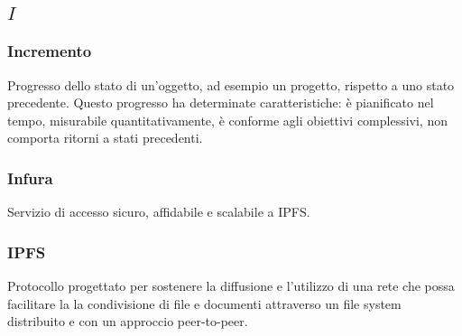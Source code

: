 \subsection*{\quad$I\quad$}
\subsubsection*{Incremento}
Progresso dello stato di un'oggetto, ad esempio un progetto, rispetto a uno stato precedente. Questo progresso ha determinate caratteristiche: è pianificato nel tempo, misurabile quantitativamente, è conforme agli obiettivi complessivi, non comporta ritorni a stati precedenti.

\subsubsection*{Infura}
Servizio di accesso sicuro, affidabile e scalabile a IPFS\glo.

\subsubsection*{IPFS}
Protocollo progettato per sostenere la diffusione e l'utilizzo di una rete che possa facilitare la la condivisione di file e documenti attraverso un file system distribuito e con un approccio peer-to-peer\glo.

